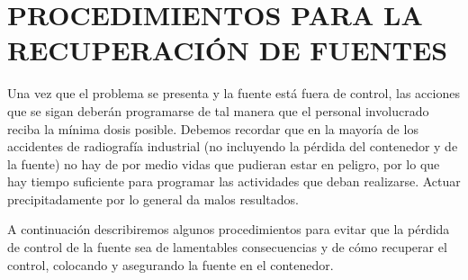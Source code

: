 \section*{PROCEDIMIENTOS PARA LA RECUPERACIÓN DE FUENTES}

Una vez que el problema se presenta y la fuente está fuera de control, las acciones que se sigan deberán programarse de tal manera que el personal involucrado reciba la mínima dosis posible. Debemos recordar que en la mayoría de los accidentes de radiografía industrial (no incluyendo la pérdida del contenedor y de la fuente) no hay de por medio vidas que pudieran estar en peligro, por lo que hay tiempo suficiente para programar las actividades que deban realizarse. Actuar precipitadamente por lo general da malos resultados.

A continuación describiremos algunos procedimientos para evitar que la pérdida de control de la fuente sea de lamentables consecuencias y de cómo recuperar el control, colocando y asegurando la fuente en el contenedor.
